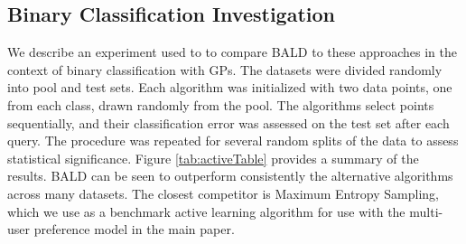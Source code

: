 
\subsection{Binary Classification Investigation}

We describe an experiment used to to compare BALD to these approaches in the context of binary classification with GPs.
The datasets were divided randomly into pool and test sets.
Each algorithm was initialized with two data points, one from each class, drawn randomly from the pool.
The algorithms select points sequentially, and their classification error was assessed on the test set after each query. The procedure was repeated for several random splits of the data to 
assess statistical significance.
Figure \ref{tab:activeTable} provides a summary of the results. 
BALD can be seen to outperform consistently the alternative algorithms across many datasets. The closest competitor is Maximum Entropy Sampling, which we use as a benchmark active learning algorithm for use with the multi-user preference model in the main paper. 

